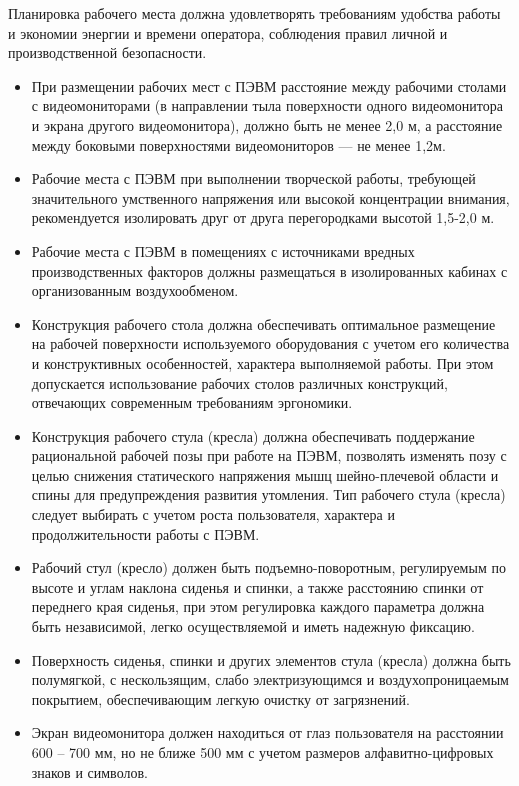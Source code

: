 Планировка рабочего места должна удовлетворять требованиям удобства работы и экономии энергии и времени оператора, соблюдения правил личной и производственной безопасности.
\begin{itemize}
  \item При размещении рабочих мест с ПЭВМ расстояние между рабочими столами с видеомониторами (в направлении тыла поверхности одного видеомонитора и экрана другого видеомонитора), должно быть не менее 2,0 м, а расстояние между боковыми поверхностями видеомониторов --- не менее 1,2м.
  \item Рабочие места с ПЭВМ при выполнении творческой работы, требующей значительного умственного напряжения или высокой концентрации внимания, рекомендуется изолировать друг от друга перегородками высотой 1,5-2,0 м.
  \item Рабочие места с ПЭВМ в помещениях с источниками вредных производственных факторов должны размещаться в изолированных кабинах с организованным воздухообменом.
  \item Конструкция рабочего стола должна обеспечивать оптимальное размещение на рабочей поверхности используемого оборудования с учетом его количества и конструктивных особенностей, характера выполняемой работы. При этом допускается использование рабочих столов различных конструкций, отвечающих современным требованиям эргономики.
  \item Конструкция рабочего стула (кресла) должна обеспечивать поддержание рациональной рабочей позы при работе на ПЭВМ, позволять изменять позу с целью снижения статического напряжения мышц шейно-плечевой области и спины для предупреждения развития утомления. Тип рабочего стула (кресла) следует выбирать с учетом роста пользователя, характера и продолжительности работы с ПЭВМ.
  \item Рабочий стул (кресло) должен быть подъемно-поворотным, регулируемым по высоте и углам наклона сиденья и спинки, а также расстоянию спинки от переднего края сиденья, при этом регулировка каждого параметра должна быть независимой, легко осуществляемой и иметь надежную фиксацию.
  \item Поверхность сиденья, спинки и других элементов стула (кресла) должна быть полумягкой, с нескользящим, слабо электризующимся и воздухопроницаемым покрытием, обеспечивающим легкую очистку от загрязнений.
  \item Экран видеомонитора должен находиться от глаз пользователя на расстоянии 600 -- 700 мм, но не ближе 500 мм с учетом размеров алфавитно-цифровых знаков и символов.
\end{itemize}
